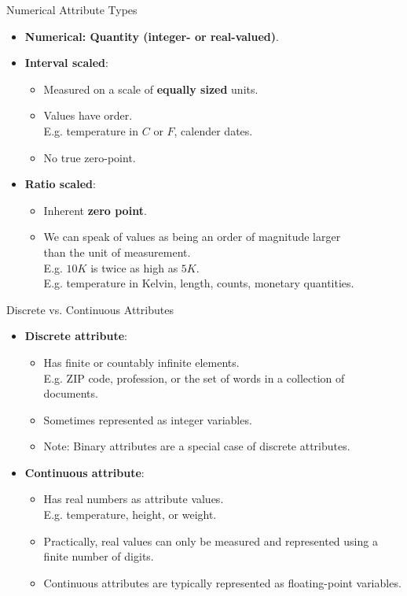 \begin{frame}{Numerical Attribute Types}
  \begin{itemize}
  \item \textbf{Numerical: Quantity (integer- or real-valued)}.
  \item \textbf{Interval scaled}:
    \begin{itemize}
    \item Measured on a scale of \textbf{equally sized} units.
    \item Values have order.\\
      E.g. temperature in $C$ or $F$, calender dates.
    \item No true zero-point.
    \end{itemize}
  \item \textbf{Ratio scaled}:
    \begin{itemize}
    \item Inherent \textbf{zero point}.
    \item We can speak of values as being an order of magnitude larger \\
      than the unit of measurement.\\
      E.g. $10 K$ is twice as high as $5 K$.\\
      E.g. temperature in Kelvin, length, counts, monetary quantities.
    \end{itemize}
  \end{itemize}
\end{frame}

\begin{frame}{Discrete vs. Continuous Attributes }
  \begin{itemize}
  \item \textbf{Discrete attribute}:
    \begin{itemize}
    \item Has finite or countably infinite elements.\\
      E.g. ZIP code, profession, or the set of words in a collection of documents.
    \item Sometimes represented as integer variables.
    \item Note: Binary attributes are a special case of discrete attributes.
    \end{itemize}
  \item \textbf{Continuous attribute}:
    \begin{itemize}
    \item Has real numbers as attribute values.\\
      E.g. temperature, height, or weight.
    \item Practically, real values can only be measured and represented using a finite number of digits.
    \item Continuous attributes are typically represented as floating-point variables.
    \end{itemize}
  \end{itemize}
\end{frame}
